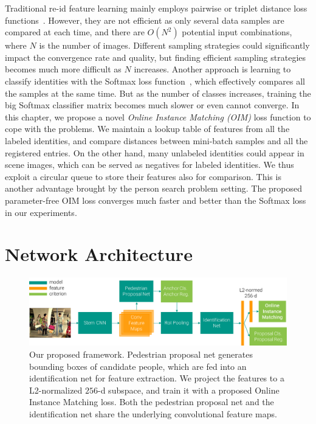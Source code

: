 Traditional re-id feature learning mainly employs pairwise or triplet distance loss functions~\cite{li2014deepreid,ahmed2015improved,cheng2016person,ding2015deep}. However, they are not efficient as only several data samples are compared at each time, and there are $O(N^2)$ potential input combinations, where $N$ is the number of images. Different sampling strategies could significantly impact the convergence rate and quality, but finding efficient sampling strategies becomes much more difficult as $N$ increases. Another approach is learning to classify identities with the Softmax loss function~\cite{xiao2016learning}, which effectively compares all the samples at the same time. But as the number of classes increases, training the big Softmax classifier matrix becomes much slower or even cannot converge. In this chapter, we propose a novel \textit{Online Instance Matching (OIM)} loss function to cope with the problems. We maintain a lookup table of features from all the labeled identities, and compare distances between mini-batch samples and all the registered entries. On the other hand, many unlabeled identities could appear in scene images, which can be served as negatives for labeled identities. We thus exploit a circular queue to store their features also for comparison. This is another advantage brought by the person search problem setting. The proposed parameter-free OIM loss converges much faster and better than the Softmax loss in our experiments.

\section{Network Architecture} %
\label{sec:ps-model}
\begin{figure}[t]
\begin{center}
\includegraphics[width=1.0\linewidth]{figures/person_search/framework.pdf}
\end{center}
\caption{Our proposed framework. Pedestrian proposal net generates bounding boxes of candidate people, which are fed into an identification net for feature extraction. We project the features to a L2-normalized $256$-d subspace, and train it with a proposed Online Instance Matching loss. Both the pedestrian proposal net and the identification net share the underlying convolutional feature maps.}
\label{fig:ps-framework}
\end{figure}

